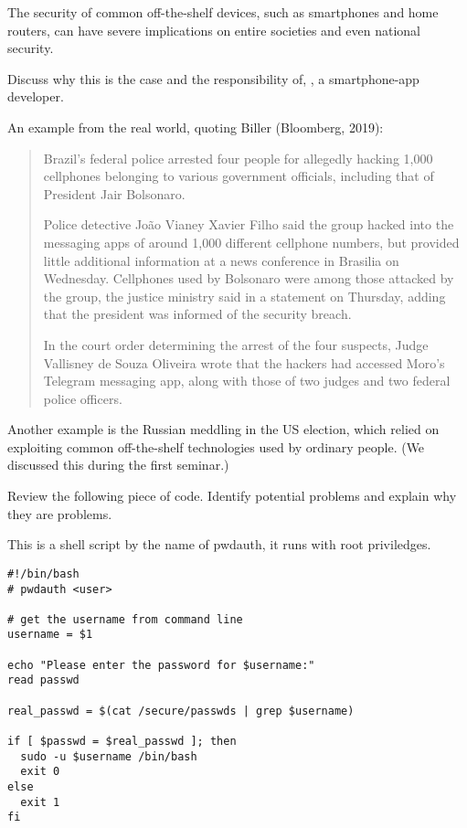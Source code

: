\question[3]
The security of common off-the-shelf devices, such as smartphones and home 
routers, can have severe implications on entire societies and even national 
security.

Discuss why this is the case and the responsibility of, \eg, a smartphone-app 
developer.

\begin{solution}
  An example from the real world, quoting Biller (Bloomberg, 2019): 
  \blockquote{%
    Brazil's federal police arrested four people for allegedly hacking 1,000 
    cellphones belonging to various government officials, including that of 
    President Jair Bolsonaro.

    Police detective João Vianey Xavier Filho said the group hacked into the 
    messaging apps of around 1,000 different cellphone numbers, but provided 
    little additional information at a news conference in Brasilia on 
    Wednesday. Cellphones used by Bolsonaro were among those attacked by the 
    group, the justice ministry said in a statement on Thursday, adding that 
    the president was informed of the security breach.

    \textelp{}

    In the court order determining the arrest of the four suspects, Judge 
    Vallisney de Souza Oliveira wrote that the hackers had accessed Moro's 
    Telegram messaging app, along with those of two judges and two federal 
    police officers.
  }

  Another example is the Russian meddling in the US election, which relied on 
  exploiting common off-the-shelf technologies used by ordinary people.
  (We discussed this during the first seminar.)
\end{solution}
\question[3]
Review the following piece of code.
Identify potential problems and explain why they are problems.

This is a shell script by the name of pwdauth, it runs with root priviledges.
\begin{lstlisting}
#!/bin/bash
# pwdauth <user>

# get the username from command line
username = $1

echo "Please enter the password for $username:"
read passwd

real_passwd = $(cat /secure/passwds | grep $username)

if [ $passwd = $real_passwd ]; then
  sudo -u $username /bin/bash
  exit 0
else
  exit 1
fi
\end{lstlisting}

